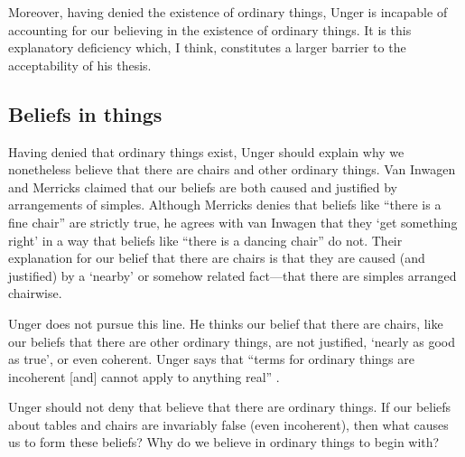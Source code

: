 \documentclass[11pt]{article}
\begin{document}
\begin{spacing}{1.5}
\begin{comment}
It is because we do seem to use color and other words in a consistent
way that the sorites paradoxes are troubling.  Unger's conclusion is
that there is no such consistency.  But where do we get this
impression of consistency in the first place?

I am not sure how Unger would reply (though I'll try to think of
something).  
\end{comment}

Moreover, having denied the existence of ordinary things, Unger is
incapable of accounting for our believing in the existence of ordinary
things.  It is this explanatory deficiency which, I think, constitutes
a larger barrier to the acceptability of his thesis.

\subsection{Beliefs in things}
\label{beliefs}
Having denied that ordinary things exist, Unger should explain why we
nonetheless believe that there are chairs and other ordinary things.
Van Inwagen and Merricks claimed that our beliefs are both caused and
justified by arrangements of simples.  Although Merricks denies that
beliefs like ``there is a fine chair'' are strictly true, he agrees with
van Inwagen that they `get something right' in a way that beliefs like
``there is a dancing chair'' do not.  Their explanation for our
belief that there are chairs is that they are caused (and justified)
by a `nearby' or somehow related fact---that there are simples
arranged chairwise.  

Unger does not pursue this line.  He thinks our belief that there are
chairs, like our beliefs that there are other ordinary things, are not
justified, `nearly as good as true', or even coherent.  Unger says
that ``terms for ordinary things are incoherent [and] cannot apply to
anything real'' \citep[147]{unger1979}.

Unger should not deny that believe that there are ordinary things.  If
our beliefs about tables and chairs are invariably false (even
incoherent), then what causes us to form these beliefs?  Why do we
believe in ordinary things to begin with?


\end{spacing}
\end{document}
